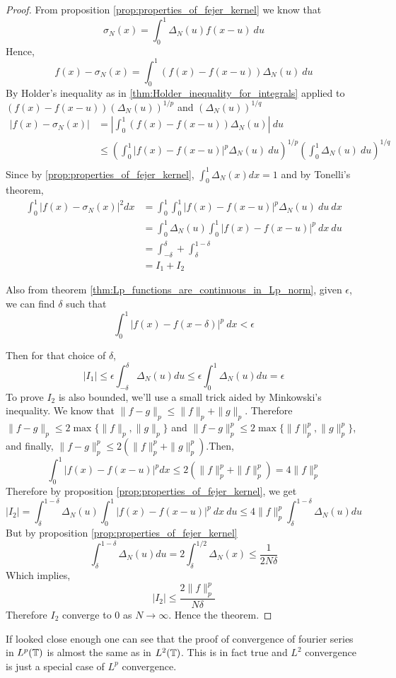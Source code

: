 \begin{proof}
  From proposition \ref{prop:properties_of_fejer_kernel} we know that
  \begin{displaymath}
    \sigma_N(x) = \int_0^1 \Delta_N(u)f(x-u) \ du 
  \end{displaymath}
  Hence,
  $$ f(x) - \sigma_N(x) = \int_0^1 (f(x) - f(x-u))\Delta_N(u) \ du $$ 
  By Holder's inequality as in \ref{thm:Holder_inequality_for_integrals} applied to $(f(x) - f(x-u))(\Delta_N(u))^{1/p}$ and $(\Delta_N(u))^{1/q}$ 
  \begin{align*}
    |f(x) - \sigma_N(x)| &= \left| \int_0^1 (f(x) - f(x-u))\Delta_N(u) \right| \ du \\
          &\le \left( \int_0^1 |f(x) - f(x-u)|^{p} \Delta_N(u) \ du \right)^{1/p} \left( \int_0^1 \Delta_N(u) \ du \right)^{1/q} \\
  \end{align*}
  Since by \ref{prop:properties_of_fejer_kernel}, $\int_0^1 \Delta_N(x) dx = 1$ and by Tonelli's theorem, 
  \begin{align*}
    \int_0^1 |f(x) - \sigma_N(x)|^2 dx &= \int_0^1 \int_0^1 |f(x) - f(x-u)|^{p} \Delta_N(u) \ du  \ dx \\
          & = \int_0^1 \Delta_N(u) \int_0^1 |f(x) - f(x-u)|^{p} \ dx  \ du \\
          & = \int_{-\delta}^\delta + \int_\delta^{1-\delta} \\
          & = I_1 + I_2
  \end{align*}

  Also from theorem \ref{thm:Lp_functions_are_continuous_in_Lp_norm}, given $\epsilon$, we can find $\delta$ such that 
  $$ \int_0^1|f(x) - f(x-\delta)|^p \ dx < \epsilon$$

  Then for that choice of $\delta$,
  $$|I_1| \le \epsilon \int_{-\delta}^\delta \Delta_N(u) du \le \epsilon \int_0^1 \Delta_N(u) du = \epsilon$$
 To prove $I_2$ is also bounded, we'll use a small trick aided by Minkowski's inequality. We know that $\|f-g\|_p \le \|f\|_p + \|g\|_p$. Therefore $\|f-g\|_p \le 2\max\{\|f\|_p, \|g\|_p\}$ and $\|f-g\|_p^p \le 2\max\{\|f\|_p^p, \|g\|_p^p\}$, and finally, $\|f-g\|_p^p \le 2(\|f\|_p^p + \|g\|_p^p)$.Then, 
  $$ \int_0^1 |f(x) - f(x-u)|^p dx \le 2(\|f\|_p^p + \|f\|_p^p) = 4\|f\|_p^p$$
  Therefore by proposition \ref{prop:properties_of_fejer_kernel}, we get 
  $$|I_2| = \int_\delta^{1-\delta} \Delta_N(u) \int_0^1 |f(x) - f(x-u)|^{p} \ dx  \ du \le 4\|f\|_p^p \int_\delta^{1-\delta}\Delta_N(u) du$$
  But by proposition \ref{prop:properties_of_fejer_kernel} 
  $$ \int_\delta^{1-\delta}\Delta_N(u)du = 2\int_\delta^{1/2}\Delta_N(x) \le \frac{1}{2N\delta}$$
  Which implies, 
  $$ |I_2| \le \frac{2\|f\|_p^p}{N\delta}$$
  Therefore $I_2$ converge to $0$ as $N \to \infty$. Hence the theorem.
\end{proof}

If looked close enough one can see that the proof of convergence of fourier series in $L^p(\mathbb T)$ is almost the same as in $L^2(\mathbb T)$. This is in fact true and $L^2$ convergence is just a special case of $L^p$ convergence.
